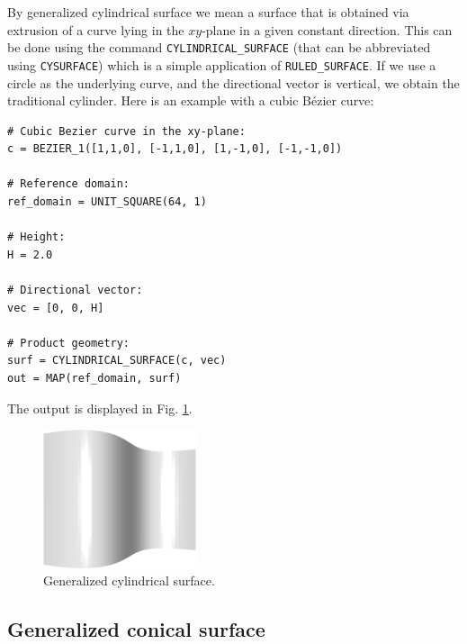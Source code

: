 By generalized cylindrical surface we mean a surface that is obtained
via extrusion of a curve lying in the $xy$-plane in a given constant 
direction. This can be done using the command {\tt CYLINDRICAL\_SURFACE}
(that can be abbreviated using {\tt CYSURFACE})
which is a simple application of {\tt RULED\_SURFACE}. If we use 
a circle as the underlying curve, and the directional vector is vertical,
we obtain the traditional cylinder. 
Here is an example with a cubic B\'ezier curve:\\

\begin{bbox}
\begin{verbatim}
# Cubic Bezier curve in the xy-plane:
c = BEZIER_1([1,1,0], [-1,1,0], [1,-1,0], [-1,-1,0])

# Reference domain:
ref_domain = UNIT_SQUARE(64, 1)

# Height:
H = 2.0

# Directional vector:
vec = [0, 0, H]

# Product geometry:
surf = CYLINDRICAL_SURFACE(c, vec)
out = MAP(ref_domain, surf)
\end{verbatim}
\end{bbox}
\vspace{6mm}

\noindent
The output is displayed in Fig. \ref{fig:curves-11}.\\

\begin{figure}[!ht]
\begin{center}
\includegraphics[width=0.4\textwidth]{img/curves-11.png}
\end{center}
\vspace{-4mm}
\caption{Generalized cylindrical surface.}
\label{fig:curves-11}
\end{figure}


\subsection{Generalized conical surface}

